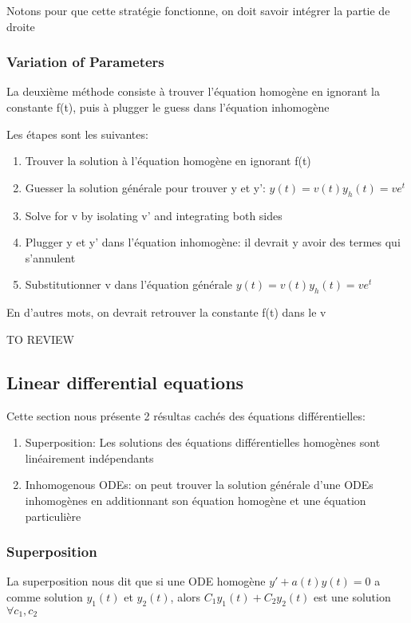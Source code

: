 \documentclass{article}
\begin{document}
Notons pour que cette stratégie fonctionne, on doit savoir intégrer la partie
de droite

\subsubsection{Variation of Parameters}

La deuxième méthode consiste à trouver l'équation homogène en ignorant la
constante f(t), puis à plugger le guess dans l'équation inhomogène

Les étapes sont les suivantes:
\begin{enumerate}
    \item Trouver la solution à l'équation homogène en ignorant f(t)
    \item Guesser la solution générale pour trouver
	y et y': $ y(t) = v(t) y_h (t) = v e^t $
    \item Solve for v by isolating v' and integrating both sides
    \item Plugger y et y' dans l'équation inhomogène: il devrait y avoir des
	termes qui s'annulent
    \item Substitutionner v dans l'équation générale
	$ y(t) = v(t) y_h (t) = v e^t $
\end{enumerate}

En d'autres mots, on devrait retrouver la constante f(t) dans le v

TO REVIEW

\subsection{Linear differential equations}

Cette section nous présente 2 résultas cachés des équations différentielles:
\begin{enumerate}
    \item Superposition: Les solutions des équations différentielles homogènes
	sont linéairement indépendants
    \item Inhomogenous ODEs: on peut trouver la solution générale d'une
	ODEs inhomogènes en additionnant son équation homogène et une
	équation particulière
\end{enumerate}

\subsubsection{Superposition}

La superposition nous dit que si une ODE homogène $y'+a(t)y(t) = 0$ a comme
solution $y_1(t)$ et $y_2(t)$, alors $ C_1 y_1(t) + C_2 y_2(t) $ est une
solution $ \forall c_1, c_2$
\end{document}

